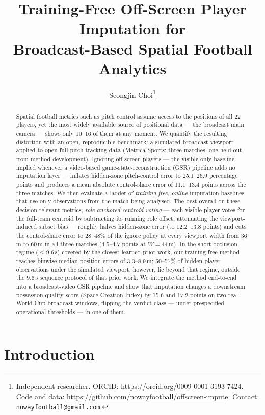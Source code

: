 \documentclass[11pt]{article}
\title{Training-Free Off-Screen Player Imputation for\\Broadcast-Based Spatial Football Analytics}
\author{%
  Seongjin Choi\thanks{Independent researcher.
  ORCID: \url{https://orcid.org/0009-0001-3193-7424}.
  Code and data: \url{https://github.com/nowayfootball/offscreen-impute}.
  Contact: \texttt{nowayfootball@gmail.com}.}%
}
\date{}
\begin{document}
\maketitle

\begin{abstract}
Spatial football metrics such as pitch control assume access to the positions of
all 22 players, yet the most widely available source of positional data --- the broadcast main
camera --- shows only 10--16 of them at any moment. We quantify the resulting
distortion with an open, reproducible benchmark: a simulated broadcast viewport
applied to open full-pitch tracking data (Metrica Sports; three matches, one
held out from method development). Ignoring off-screen
players --- the visible-only baseline implied whenever a video-based
game-state-reconstruction (GSR) pipeline adds no imputation layer --- inflates
hidden-zone pitch-control error to 25.1--26.9 percentage points and produces a
mean absolute control-share error of 11.1--13.4 points across the three
matches. We then evaluate a ladder of
\emph{training-free, online} imputation baselines that use only observations from
the match being analysed. The best overall on these decision-relevant metrics, \emph{role-anchored centroid
voting} --- each visible player votes for the full-team centroid by subtracting
its running role offset, attenuating the viewport-induced subset bias ---
roughly halves hidden-zone error (to 12.2--13.8 points) and cuts the
control-share error to 28--48\% of the ignore policy at every viewport width
from 36\,m to 60\,m in all three matches (4.5--4.7 points at $W=44$\,m). In
the short-occlusion regime ($\le$9.6\,s) covered by the closest learned prior
work, our training-free method reaches binwise median position errors of
3.3--8.9\,m; 50--57\% of hidden-player observations under the simulated
viewport, however, lie beyond that regime, outside the 9.6\,s sequence
protocol of that prior work. We integrate the
method end-to-end into a broadcast-video GSR pipeline and show that
imputation changes a downstream possession-quality score (Space-Creation
Index) by 15.6 and 17.2 points on two real World Cup broadcast windows,
flipping the verdict class --- under prespecified operational thresholds ---
in one of them.
\end{abstract}

\section{Introduction}
\end{document}
